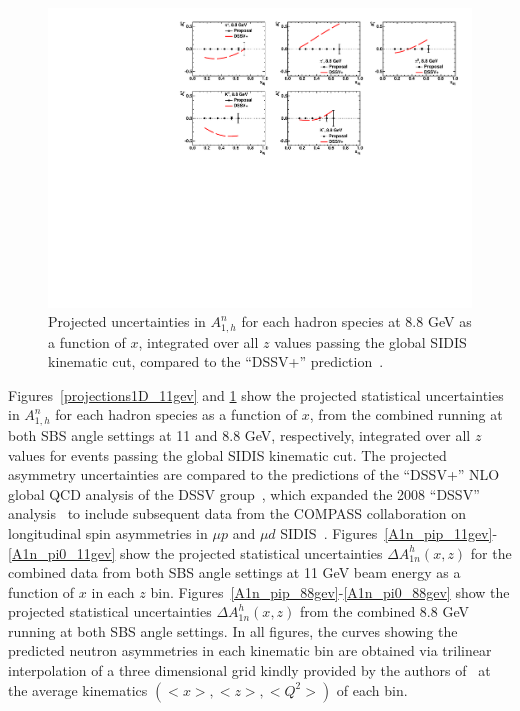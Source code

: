 \begin{figure}[h]
  \begin{center}
    \includegraphics[width=.98\textwidth]{figures/Projections1D_summary88gev.pdf}
  \end{center}
  \caption{\label{projections1D_88gev} Projected uncertainties in $A_{1,h}^n$ for each hadron species at 8.8 GeV as a function of $x$, integrated over all $z$ values passing the global SIDIS kinematic cut, compared to the ``DSSV+'' prediction~\cite{DSSVplus}.}
\end{figure}
Figures~\ref{projections1D_11gev} and \ref{projections1D_88gev} show the projected statistical uncertainties in $A_{1,h}^n$ for each hadron species as a function of $x$, from the combined running at both SBS angle settings at 11 and 8.8 GeV, respectively, integrated over all $z$ values for events passing the global SIDIS kinematic cut. The projected asymmetry uncertainties are compared to the predictions of the ``DSSV+'' NLO global QCD analysis of the DSSV group~\cite{DSSVplus}, which expanded the 2008 ``DSSV'' analysis~\cite{DSSV2008,DSSV2009} to include subsequent data from the COMPASS collaboration on longitudinal spin asymmetries in $\mu p$ and $\mu d$ SIDIS~\cite{COMPASS_d_2009,COMPASS_d_p_2010}. Figures~\ref{A1n_pip_11gev}-\ref{A1n_pi0_11gev} show the projected statistical uncertainties $\Delta A_{1n}^{h}(x,z)$ for the combined data from both SBS angle settings at 11 GeV beam energy as a function of $x$ in each $z$ bin. Figures~\ref{A1n_pip_88gev}-\ref{A1n_pi0_88gev} show the projected statistical uncertainties $\Delta A_{1n}^{h}(x,z)$ from the combined 8.8 GeV running at both SBS angle settings. In all figures, the curves showing the predicted neutron asymmetries in each kinematic bin are obtained via trilinear interpolation of a three dimensional grid kindly provided by the authors of~\cite{DSSVplus} at the average kinematics $(<x>, <z>, <Q^2>)$ of each bin. 
